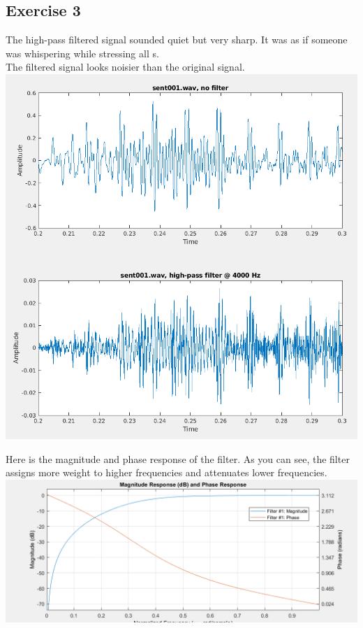 \documentclass[11pt]{article}
\begin{document}
\pagebreak
\subsection{Exercise 3}

The high-pass filtered signal sounded quiet but very sharp.
It was as if someone was whispering while stressing all s.\\

The filtered signal looks noisier than the original signal.\\




\includegraphics[width=\textwidth]{exercise3.png}


Here is the magnitude and phase response of the filter.
As you can see, the filter assigns more weight to higher frequencies and attenuates lower frequencies.\\

\includegraphics[width=\textwidth]{high_pass_filter.png}
\end{document}
